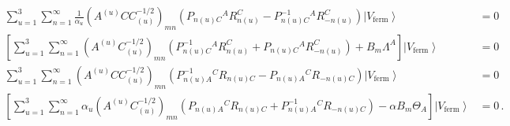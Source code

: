 \begin{equation}\label{modecond}
\begin{split}
\sum_{u=1}^3\sum_{n=1}^\infty\frac{1}{\alpha_u}(A^{(u)}CC^{-1/2}_{(u)})_{mn}(P_{n(u)C}{}^AR_{n(u)}^C
-P_{n(u)C}^{-1}{}^AR_{-n(u)}^C)\left|V_{\mbox{ferm}}\right>&=0\\
\left[\sum_{u=1}^3\sum_{n=1}^\infty(A^{(u)}C^{-1/2}_{(u)})_{mn}(P^{-1}_{n(u)C}{}^AR_{n(u)}^C
+P_{n(u)C}{}^AR_{-n(u)}^C)+B_m\Lambda^A\right]\left|V_{\mbox{ferm}}\right>&=0\\
\sum_{u=1}^3\sum_{n=1}^\infty(A^{(u)}CC^{-1/2}_{(u)})_{mn}(P^{-1}_{n(u)A}{}^CR_{n(u)C}
-P_{n(u)A}{}^CR_{-n(u)C})\left|V_{\mbox{ferm}}\right>&=0\\
\left[\sum_{u=1}^3\sum_{n=1}^\infty\alpha_u(A^{(u)}C^{-1/2}_{(u)})_{mn}(P_{n(u)A}{}^CR_{n(u)C}
+P^{-1}_{n(u)A}{}^CR_{-n(u)C})-\alpha B_m\Theta_A\right]\left|V_{\mbox{ferm}}\right>&=0\,.
\end{split}
\end{equation}

